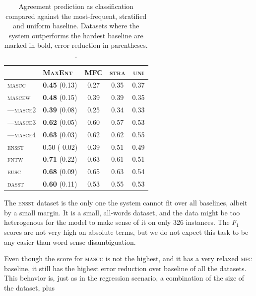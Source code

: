 \documentclass[11pt,a4paper]{article}
\begin{document}
\begin{table}[Ht!]

\begin{center}
  \begin{tabular}{ll|ccc}
 \toprule
 & \textsc{MaxEnt} & \textsc{MFC} & \textsc{stra} & \textsc{uni} \\
 \midrule
 \textsc{mascc} & \textbf{0.45} (0.13) & 0.27 & 0.35 & 0.37\\ 

 \textsc{mascew} & \textbf{0.48} (0.15)  & 0.39 & 0.39 & 0.35\\ 
---\textsc{masce2} & \textbf{0.39} (0.08) & 0.25 & 0.34 & 0.33\\ 
---\textsc{masce3} & \textbf{0.62} (0.05) & 0.60 & 0.57 & 0.53\\ 
---\textsc{masce4} & \textbf{0.63} (0.03)& 0.62 & 0.62 & 0.55\\ 
\textsc{ensst}  & 0.50 (-0.02) & 0.39 & 0.51 & 0.49\\ 
\textsc{fntw} & \textbf{0.71} (0.22) & 0.63 & 0.61 & 0.51\\ 

\textsc{eusc}  & \textbf{0.68} (0.09) & 0.65 & 0.63 & 0.54 \\
\textsc{dasst} & \textbf{0.60} (0.11) & 0.53 & 0.55 & 0.53\\ 

\bottomrule

  \end{tabular}  
\end{center}
\caption{Agreement prediction as classification compared against the most-frequent, stratified and uniform baseline. Datasets where the system outperforms the hardest baseline are marked in bold, error reduction in parentheses. \label{tab:classresults}.}
\end{table} 

The \textsc{ensst} dataset is the only one the system cannot fit over all baselines, albeit by a small margin. It is a small, all-words dataset, and the data might be too heterogenous for the model to make sense of it on only 326 instances. The $F_1$ scores are not very high on absolute terms, but we do not expect this task to be any easier than word sense disambiguation. 

Even though the score for \textsc{mascc} is not the highest, and it has a very relaxed \textsc{mfc} baseline, it still has the highest error reduction over baseline of all the datasets. This behavior is, just as in the regression scenario, a combination of the size of the dataset, plus 
\end{document}
